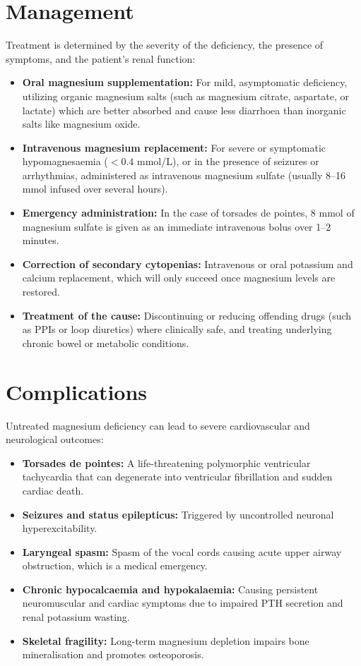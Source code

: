 \section*{Management}
Treatment is determined by the severity of the deficiency, the presence of symptoms, and the patient's renal function:
\begin{itemize}
    \item \textbf{Oral magnesium supplementation:} For mild, asymptomatic deficiency, utilizing organic magnesium salts (such as magnesium citrate, aspartate, or lactate) which are better absorbed and cause less diarrhoea than inorganic salts like magnesium oxide.
    \item \textbf{Intravenous magnesium replacement:} For severe or symptomatic hypomagnesaemia ($<0.4$ mmol/L), or in the presence of seizures or arrhythmias, administered as intravenous magnesium sulfate (usually 8--16 mmol infused over several hours).
    \item \textbf{Emergency administration:} In the case of torsades de pointes, 8 mmol of magnesium sulfate is given as an immediate intravenous bolus over 1--2 minutes.
    \item \textbf{Correction of secondary cytopenias:} Intravenous or oral potassium and calcium replacement, which will only succeed once magnesium levels are restored.
    \item \textbf{Treatment of the cause:} Discontinuing or reducing offending drugs (such as PPIs or loop diuretics) where clinically safe, and treating underlying chronic bowel or metabolic conditions.
\end{itemize}

\section*{Complications}
Untreated magnesium deficiency can lead to severe cardiovascular and neurological outcomes:
\begin{itemize}
    \item \textbf{Torsades de pointes:} A life-threatening polymorphic ventricular tachycardia that can degenerate into ventricular fibrillation and sudden cardiac death.
    \item \textbf{Seizures and status epilepticus:} Triggered by uncontrolled neuronal hyperexcitability.
    \item \textbf{Laryngeal spasm:} Spasm of the vocal cords causing acute upper airway obstruction, which is a medical emergency.
    \item \textbf{Chronic hypocalcaemia and hypokalaemia:} Causing persistent neuromuscular and cardiac symptoms due to impaired PTH secretion and renal potassium wasting.
    \item \textbf{Skeletal fragility:} Long-term magnesium depletion impairs bone mineralisation and promotes osteoporosis.
\end{itemize}

